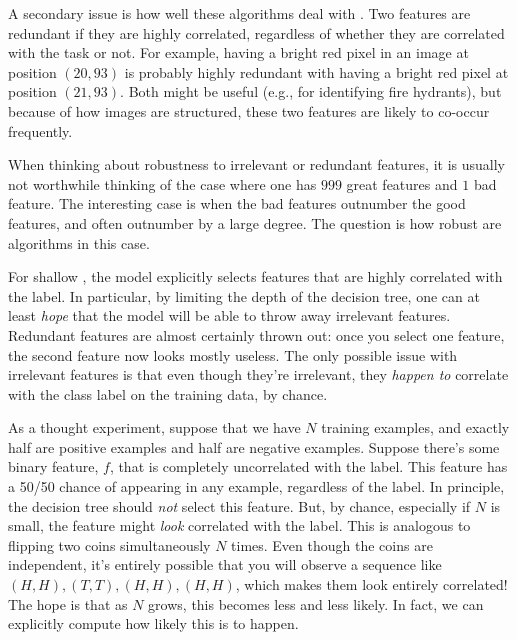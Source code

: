 A secondary issue is how well these algorithms deal with
.  Two features are redundant if they are
highly correlated, regardless of whether they are correlated with the
task or not.  For example, having a bright red pixel in an image at
position $(20,93)$ is probably highly redundant with having a bright
red pixel at position $(21,93)$.  Both might be useful (e.g., for
identifying fire hydrants), but because of how images are structured,
these two features are likely to co-occur frequently.



When thinking about robustness to irrelevant or redundant features, it
is usually not worthwhile thinking of the case where one has $999$
great features and $1$ bad feature.  The interesting case is when the
bad features outnumber the good features, and often outnumber by a
large degree.  %
The
question is how robust are algorithms in this case.

For shallow , the model explicitly selects
features that are highly correlated with the label.  In particular, by
limiting the depth of the decision tree, one can at least \emph{hope}
that the model will be able to throw away irrelevant features.
Redundant features are almost certainly thrown out: once you select
one feature, the second feature now looks mostly useless.  The only
possible issue with irrelevant features is that even though they're
irrelevant, they \emph{happen to} correlate with the class label on
the training data, by chance.

As a thought experiment, suppose that we have $N$ training examples,
and exactly half are positive examples and half are negative
examples.  Suppose there's some binary feature, $f$, that is completely
uncorrelated with the label.  This feature has a 50/50 chance of
appearing in any example, regardless of the label.  In principle, the
decision tree should \emph{not} select this feature.  But, by chance,
especially if $N$ is small, the feature might \emph{look} correlated
with the label.  This is analogous to flipping two coins
simultaneously $N$ times.  Even though the coins are independent, it's
entirely possible that you will observe a sequence like $(H,H), (T,T),
(H,H), (H,H)$, which makes them look entirely correlated!  The hope is
that as $N$ grows, this becomes less and less likely.  In fact, we can
explicitly compute how likely this is to happen.


